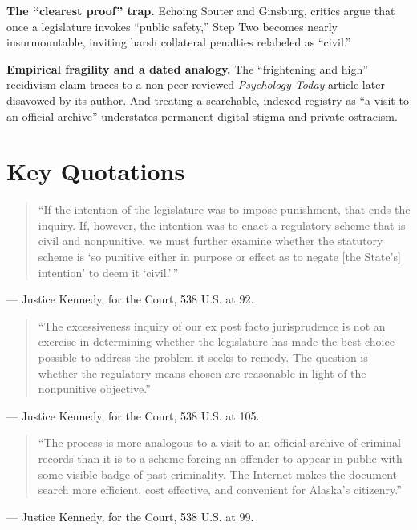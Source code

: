 \documentclass[12pt]{article}
\begin{document}
\textbf{The ``clearest proof'' trap.} Echoing Souter and Ginsburg, critics argue that once a legislature invokes ``public safety,'' Step Two becomes nearly insurmountable, inviting harsh collateral penalties relabeled as ``civil.''

\textbf{Empirical fragility and a dated analogy.} The ``frightening and high'' recidivism claim traces to a non-peer-reviewed \textit{Psychology Today} article later disavowed by its author. And treating a searchable, indexed registry as ``a visit to an official archive'' understates permanent digital stigma and private ostracism.

\section{Key Quotations}

\begin{quote}
``If the intention of the legislature was to impose punishment, that ends the inquiry. If, however, the intention was to enact a regulatory scheme that is civil and nonpunitive, we must further examine whether the statutory scheme is `so punitive either in purpose or effect as to negate [the State's] intention' to deem it `civil.'\,''
\end{quote}
\noindent --- Justice Kennedy, for the Court, 538 U.S. at 92.

\begin{quote}
``The excessiveness inquiry of our ex post facto jurisprudence is not an exercise in determining whether the legislature has made the best choice possible to address the problem it seeks to remedy. The question is whether the regulatory means chosen are reasonable in light of the nonpunitive objective.''
\end{quote}
\noindent --- Justice Kennedy, for the Court, 538 U.S. at 105.

\begin{quote}
``The process is more analogous to a visit to an official archive of criminal records than it is to a scheme forcing an offender to appear in public with some visible badge of past criminality. The Internet makes the document search more efficient, cost effective, and convenient for Alaska's citizenry.''
\end{quote}
\noindent --- Justice Kennedy, for the Court, 538 U.S. at 99.
\end{document}
